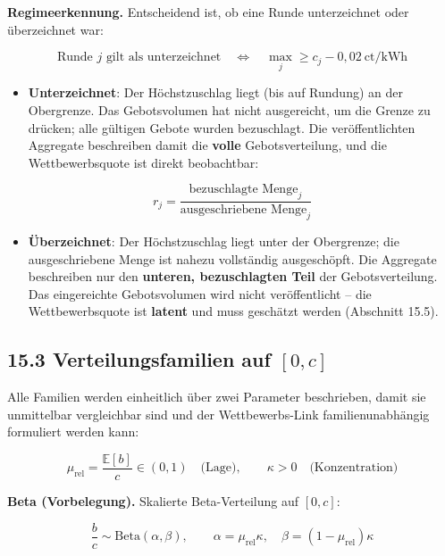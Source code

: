 \documentclass[
  a4paper,
  10pt]{article}
\providecommand{\tightlist}{%
  \setlength{\itemsep}{0pt}\setlength{\parskip}{0pt}}
\begin{document}
\textbf{Regimeerkennung.} Entscheidend ist, ob eine Runde unterzeichnet
oder überzeichnet war:

\[ \text{Runde } j \text{ gilt als unterzeichnet} \quad \Leftrightarrow \quad \max_j \geq c_j - 0{,}02\ \text{ct/kWh} \]

\begin{itemize}
\tightlist
\item
  \textbf{Unterzeichnet}: Der Höchstzuschlag liegt (bis auf Rundung) an
  der Obergrenze. Das Gebotsvolumen hat nicht ausgereicht, um die Grenze
  zu drücken; alle gültigen Gebote wurden bezuschlagt. Die
  veröffentlichten Aggregate beschreiben damit die \textbf{volle}
  Gebotsverteilung, und die Wettbewerbsquote ist direkt beobachtbar:
\end{itemize}

\[ r_j = \frac{\text{bezuschlagte Menge}_j}{\text{ausgeschriebene Menge}_j} \]

\begin{itemize}
\tightlist
\item
  \textbf{Überzeichnet}: Der Höchstzuschlag liegt unter der Obergrenze;
  die ausgeschriebene Menge ist nahezu vollständig ausgeschöpft. Die
  Aggregate beschreiben nur den \textbf{unteren, bezuschlagten Teil} der
  Gebotsverteilung. Das eingereichte Gebotsvolumen wird nicht
  veröffentlicht -- die Wettbewerbsquote ist \textbf{latent} und muss
  geschätzt werden (Abschnitt 15.5).
\end{itemize}

\hypertarget{verteilungsfamilien-auf-0-c}{%
\subsection{\texorpdfstring{15.3 Verteilungsfamilien auf
\([0, c]\)}{15.3 Verteilungsfamilien auf {[}0, c{]}}}\label{verteilungsfamilien-auf-0-c}}

Alle Familien werden einheitlich über zwei Parameter beschrieben, damit
sie unmittelbar vergleichbar sind und der Wettbewerbs-Link
familienunabhängig formuliert werden kann:

\[ \mu_{\mathrm{rel}} = \frac{\mathbb{E}[b]}{c} \in (0,1) \quad \text{(Lage)}, \qquad \kappa > 0 \quad \text{(Konzentration)} \]

\textbf{Beta (Vorbelegung).} Skalierte Beta-Verteilung auf \([0,c]\):

\[ \frac{b}{c} \sim \mathrm{Beta}(\alpha, \beta), \qquad \alpha = \mu_{\mathrm{rel}} \kappa, \quad \beta = (1-\mu_{\mathrm{rel}})\kappa \]
\end{document}
